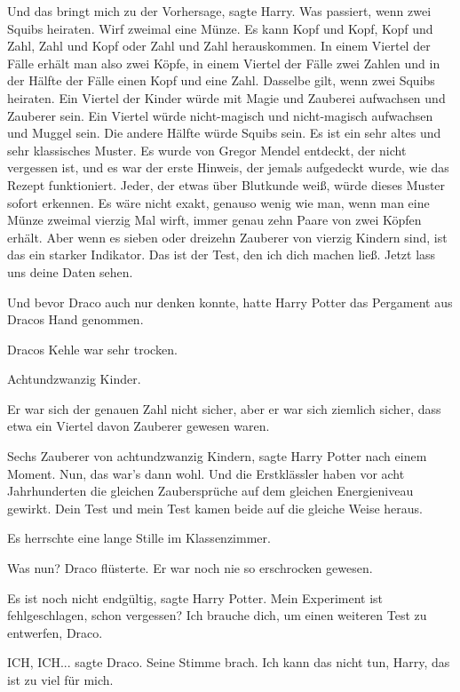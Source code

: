 \glqq{}Und das bringt mich zu der Vorhersage\grqq{}, sagte Harry. \glqq{}Was
passiert, wenn zwei Squibs heiraten. Wirf zweimal eine Münze. Es kann Kopf und
Kopf, Kopf und Zahl, Zahl und Kopf oder Zahl und Zahl herauskommen. In einem
Viertel der Fälle erhält man also zwei Köpfe, in einem Viertel der Fälle zwei
Zahlen und in der Hälfte der Fälle einen Kopf und eine Zahl. Dasselbe gilt, wenn
zwei Squibs heiraten. Ein Viertel der Kinder würde mit Magie und Zauberei
aufwachsen und Zauberer sein. Ein Viertel würde nicht-magisch und nicht-magisch
aufwachsen und Muggel sein. Die andere Hälfte würde Squibs sein. Es ist ein sehr
altes und sehr klassisches Muster. Es wurde von Gregor Mendel entdeckt, der
nicht vergessen ist, und es war der erste Hinweis, der jemals aufgedeckt wurde,
wie das Rezept funktioniert. Jeder, der etwas über Blutkunde weiß, würde dieses
Muster sofort erkennen. Es wäre nicht exakt, genauso wenig wie man, wenn man
eine Münze zweimal vierzig Mal wirft, immer genau zehn Paare von zwei Köpfen
erhält. Aber wenn es sieben oder dreizehn Zauberer von vierzig Kindern sind, ist
das ein starker Indikator. Das ist der Test, den ich dich machen ließ. Jetzt
lass uns deine Daten sehen.\grqq{}

Und bevor Draco auch nur denken konnte, hatte Harry Potter das Pergament aus
Dracos Hand genommen.

Dracos Kehle war sehr trocken.

Achtundzwanzig Kinder.

Er war sich der genauen Zahl nicht sicher, aber er war sich ziemlich sicher,
dass etwa ein Viertel davon Zauberer gewesen waren.

\glqq{}Sechs Zauberer von achtundzwanzig Kindern\grqq{}, sagte Harry Potter nach
einem Moment. \glqq{}Nun, das war's dann wohl. Und die Erstklässler haben vor
acht Jahrhunderten die gleichen Zaubersprüche auf dem gleichen Energieniveau
gewirkt. Dein Test und mein Test kamen beide auf die gleiche Weise
heraus.\grqq{}

Es herrschte eine lange Stille im Klassenzimmer.

\glqq{}Was nun?\grqq{} Draco flüsterte. Er war noch nie so erschrocken gewesen.

\glqq{}Es ist noch nicht endgültig\grqq{}, sagte Harry Potter. \glqq{}Mein
Experiment ist fehlgeschlagen, schon vergessen? Ich brauche dich, um einen
weiteren Test zu entwerfen, Draco.\grqq{}

\glqq{}ICH, ICH...\grqq{} sagte Draco. Seine Stimme brach. \glqq{}Ich kann das
nicht tun, Harry, das ist zu viel für mich.\grqq{}

